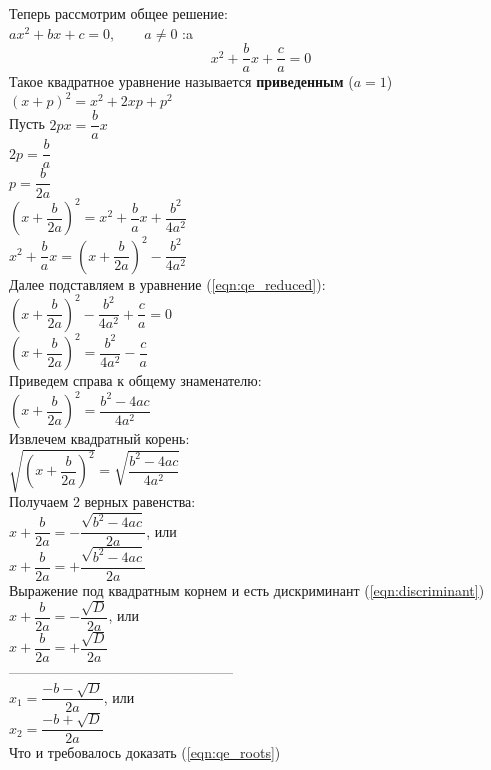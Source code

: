 Теперь рассмотрим общее решение:\\
$ ax^2 + bx + c = 0, \qquad a \ne 0 $ \qquad :a \\
\begin{equation}
  \label{eqn:qe_reduced}
  x^2 + \frac{b}{a}x + \frac{c}{a} = 0
\end{equation}
Такое квадратное уравнение называется \textbf{приведенным} ($ a=1 $)\\
$ (x + p)^2 = x^2 + 2xp + p^2 $ \\
Пусть $ 2px = \dfrac{b}{a}x $ \\
$ 2p = \dfrac{b}{a} $ \\
$ p = \dfrac{b}{2a} $ \\
$ \left(x + \dfrac{b}{2a}\right)^2 = x^2 + \dfrac{b}{a}x + \dfrac{b^2}{4a^2} $ \\
$ x^2 + \dfrac{b}{a}x = \left( x + \dfrac{b}{2a} \right)^2 - \dfrac{b^2}{4a^2} $ \\
Далее подставляем в уравнение (\ref{eqn:qe_reduced}): \\
$ \left( x + \dfrac{b}{2a} \right)^2 - \dfrac{b^2}{4a^2} + \dfrac{c}{a} = 0 $ \\
$ \left( x + \dfrac{b}{2a} \right)^2 = \dfrac{b^2}{4a^2} - \dfrac{c}{a}$ \\
Приведем справа к общему знаменателю: \\
$ \left( x + \dfrac{b}{2a} \right)^2 = \dfrac{b^2 - 4ac}{4a^2} $ \\
Извлечем квадратный корень: \\
$ \sqrt{\left( x + \dfrac{b}{2a} \right)^2} = \sqrt{\dfrac{b^2 - 4ac}{4a^2}} $ \\
Получаем 2 верных равенства: \\
$ x + \dfrac{b}{2a} = -\dfrac{\sqrt{b^2 - 4ac}}{2a} $, \qquad или \\
$ x + \dfrac{b}{2a} = +\dfrac{\sqrt{b^2 - 4ac}}{2a} $ \\
Выражение под квадратным корнем и есть дискриминант (\ref{eqn:discriminant}) \\
$ x + \dfrac{b}{2a} = -\dfrac{\sqrt{D}}{2a} $, \qquad или \\
$ x + \dfrac{b}{2a} = +\dfrac{\sqrt{D}}{2a} $ \\
------------------------------------------------\\
$ x_1 = \dfrac{-b - \sqrt{D}}{2a} $, \qquad или \\
$ x_2 = \dfrac{-b + \sqrt{D}}{2a} $ \\
Что и требовалось доказать (\ref{eqn:qe_roots})

